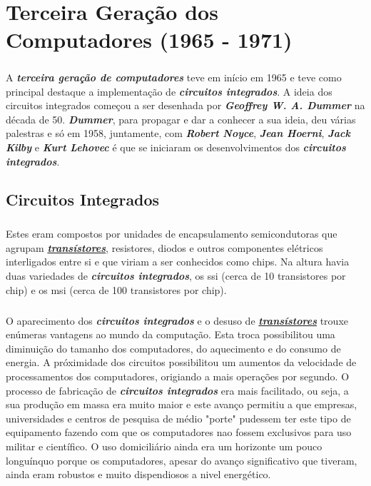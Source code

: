 \documentclass{report}
\begin{document}
\chapter{Terceira Geração dos Computadores (1965 - 1971)}
\label{chap.TG}
			
\paragraph{}
A  \textbf{\textit{terceira geração de computadores}}\cite{terceirageracao} teve em início em 1965 e teve como principal destaque a implementação de \textbf{\textit{circuitos integrados}}. \newline
A ideia dos circuitos integrados começou a ser desenhada por \textbf{\textit{Geoffrey W. A. Dummer}} na década de 50. \textbf{\textit{Dummer}}, para propagar e dar a conhecer a sua ideia, deu várias palestras e só em 1958, juntamente, com \textbf{\textit{Robert Noyce}}, \textbf{\textit{Jean Hoerni}}, \textbf{\textit{Jack Kilby}} e \textbf{\textit{Kurt Lehovec}} é que se iniciaram os desenvolvimentos dos \textbf{\textit{circuitos integrados}}.

\section{Circuitos Integrados}
\label{sec:circuitos}
\paragraph{}
Estes eram compostos por unidades de encapsulamento semicondutoras que agrupam \hyperref[sec:transistor]{\textbf{\textit{transístores}}}, resistores, diodos e outros componentes elétricos interligados entre si e que viriam a ser conhecidos como chips. Na altura havia duas variedades de \textbf{\textit{circuitos integrados}}, os \acs{ssi} (cerca de 10 transistores por chip) e os \acs{msi} (cerca de 100 transistores por chip).
\paragraph{}
O aparecimento dos \textbf{\textit{circuitos integrados}} e o desuso de \hyperref[sec:transistor]{\textbf{\textit{transístores}}} trouxe enúmeras vantagens ao mundo da computação. Esta troca possibilitou uma diminuição do tamanho dos computadores, do aquecimento e do consumo de energia. A próximidade dos circuitos possibilitou um aumentos da velocidade de processamentos dos computadores, origiando a mais operações por segundo. O processo de fabricação de \textbf{\textit{circuitos integrados}} era mais facilitado, ou seja, a sua produção em massa era muito maior e este avanço permitiu a que empresas, universidades e centros de pesquisa de médio "porte" pudessem ter este tipo de equipamento fazendo com que os computadores nao fossem exclusivos para uso militar e científico. O uso domiciliário ainda era um horizonte um pouco longuínquo porque os computadores, apesar do avanço significativo que tiveram, ainda eram robustos e muito dispendiosos a nivel energético.
\end{document}
